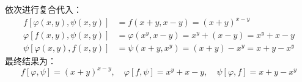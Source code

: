 \begin{solution}
    依次进行复合代入：
    \begin{equation}
        \begin{aligned}
            f[\varphi(x, y), \psi(x, y)] & = f(x+y, x-y) = (x+y)^{x-y}                     \\
            \varphi[f(x, y), \psi(x, y)] & = \varphi(x^y, x-y) = x^y + (x-y) = x^y + x - y \\
            \psi[\varphi(x, y), f(x, y)] & = \psi(x+y, x^y) = (x+y) - x^y = x + y - x^y
        \end{aligned}
    \end{equation}
    最终结果为：
    \begin{equation}
        \boxed{f[\varphi, \psi] = (x+y)^{x-y}, \quad \varphi[f, \psi] = x^y + x - y, \quad \psi[\varphi, f] = x + y - x^y}
    \end{equation}
\end{solution}



